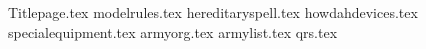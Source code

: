 \documentclass[a4paper,10pt]{article}
\begin{document}
{Titlepage.tex}
{modelrules.tex}
\additionalspacebeforemaintitle{}
{hereditaryspell.tex}
\newpage
{howdahdevices.tex}
\newpage
{specialequipment.tex}
\newpage
{armyorg.tex}
{armylist.tex}
\newpage
{qrs.tex}
\end{document}
